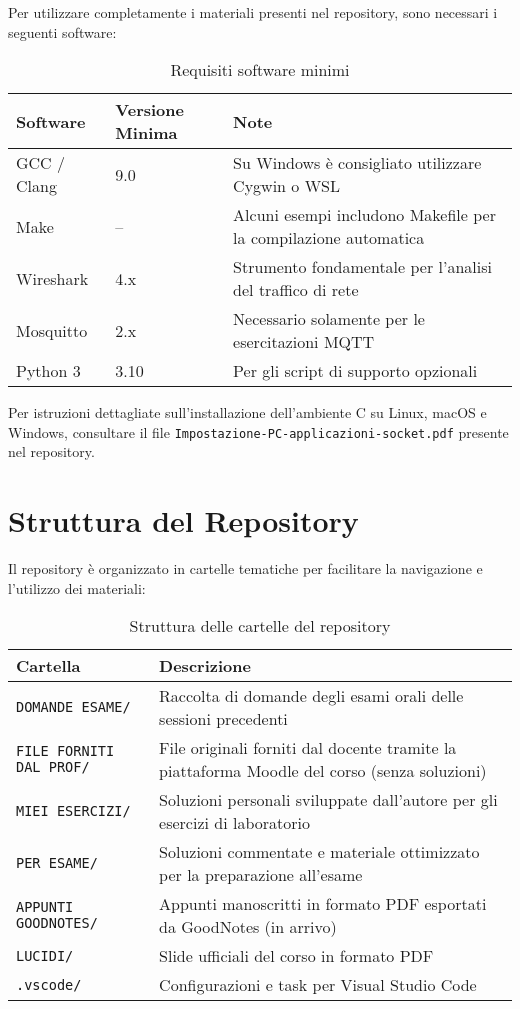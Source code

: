 \documentclass[12pt,a4paper]{article}
\begin{document}
Per utilizzare completamente i materiali presenti nel repository, sono necessari i seguenti software:

\begin{table}[h!]
\centering
\begin{tabular}{|l|l|p{6cm}|}
\hline
\textbf{Software} & \textbf{Versione Minima} & \textbf{Note} \\
\hline
GCC / Clang & 9.0 & Su Windows è consigliato utilizzare Cygwin o WSL \\
\hline
Make & -- & Alcuni esempi includono Makefile per la compilazione automatica \\
\hline
Wireshark & 4.x & Strumento fondamentale per l'analisi del traffico di rete \\
\hline
Mosquitto & 2.x & Necessario solamente per le esercitazioni MQTT \\
\hline
Python 3 & 3.10 & Per gli script di supporto opzionali \\
\hline
\end{tabular}
\caption{Requisiti software minimi}
\end{table}

\begin{tcolorbox}[colback=yellow!10!white,colframe=orange!75!black,title=Nota Importante]
Per istruzioni dettagliate sull'installazione dell'ambiente C su Linux, macOS e Windows, consultare il file \texttt{Impostazione-PC-applicazioni-socket.pdf} presente nel repository.
\end{tcolorbox}

\section{Struttura del Repository}

Il repository è organizzato in cartelle tematiche per facilitare la navigazione e l'utilizzo dei materiali:

\begin{table}[h!]
\centering
\begin{tabular}{|l|p{8cm}|}
\hline
\textbf{Cartella} & \textbf{Descrizione} \\
\hline
\texttt{DOMANDE ESAME/} & Raccolta di domande degli esami orali delle sessioni precedenti \\
\hline
\texttt{FILE FORNITI DAL PROF/} & File originali forniti dal docente tramite la piattaforma Moodle del corso (senza soluzioni) \\
\hline
\texttt{MIEI ESERCIZI/} & Soluzioni personali sviluppate dall'autore per gli esercizi di laboratorio \\
\hline
\texttt{PER ESAME/} & Soluzioni commentate e materiale ottimizzato per la preparazione all'esame \\
\hline
\texttt{APPUNTI GOODNOTES/} & Appunti manoscritti in formato PDF esportati da GoodNotes (in arrivo) \\
\hline
\texttt{LUCIDI/} & Slide ufficiali del corso in formato PDF \\
\hline
\texttt{.vscode/} & Configurazioni e task per Visual Studio Code \\
\hline
\end{tabular}
\caption{Struttura delle cartelle del repository}
\end{table}
\end{document}
